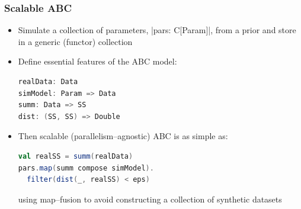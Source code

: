 \documentclass[mathserif,handout]{beamer}
\begin{document}

\begin{frame}[fragile]
\frametitle{Scalable ABC}
\begin{itemize}
\item Simulate a collection of parameters, |pars: C[Param]|, from a prior and store in a generic (functor) collection
\item Define essential features of the ABC model:
\begin{lstlisting}[language=scala]
realData: Data    
simModel: Param => Data
summ: Data => SS
dist: (SS, SS) => Double
\end{lstlisting}
\item Then scalable (parallelism--agnostic) ABC is as simple as:
\begin{lstlisting}[language=scala]
val realSS = summ(realData)
pars.map(summ compose simModel).
  filter(dist(_, realSS) < eps)
\end{lstlisting}
using map--fusion to avoid constructing a collection of synthetic datasets
\end{itemize}
\end{frame}
\end{document}
